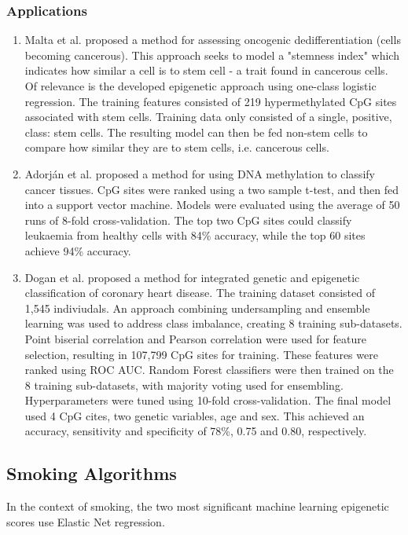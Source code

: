 \documentclass{article}
\begin{document}
\subsubsection{Applications} \label{sec:ml-examples}
\begin{enumerate}
    \item Malta et al. \cite{malta2018machine} proposed a method for assessing oncogenic dedifferentiation (cells becoming cancerous). This approach seeks to model a "stemness index" which indicates how similar a cell is to stem cell - a trait found in cancerous cells. Of relevance is the developed epigenetic approach using one-class logistic regression. The training features consisted of 219 hypermethylated CpG sites associated with stem cells. Training data only consisted of a single, positive, class: stem cells. The resulting model can then be fed non-stem cells to compare how similar they are to stem cells, i.e. cancerous cells.

    \item Adorj\'an et al. \cite{adorjan2002tumour} proposed a method for using DNA methylation to classify cancer tissues. CpG sites were ranked using a two sample t-test, and then fed into a support vector machine. Models were evaluated using the average of 50 runs of 8-fold cross-validation. The top two CpG sites could classify leukaemia from healthy cells with 84\% accuracy, while the top 60 sites achieve 94\% accuracy.

    \item Dogan et al. \cite{dogan2018integrated} proposed a method for integrated genetic and epigenetic classification of coronary heart disease. The training dataset consisted of 1,545 indiviudals. An approach combining undersampling and ensemble learning \cite{liu2008exploratory} was used to address class imbalance, creating 8 training sub-datasets. Point biserial correlation and Pearson correlation were used for feature selection, resulting in 107,799 CpG sites for training. These features were ranked using ROC AUC. Random Forest classifiers were then trained on the 8 training sub-datasets, with majority voting used for ensembling. Hyperparameters were tuned using 10-fold cross-validation. The final model used 4 CpG cites, two genetic variables, age and sex. This achieved an accuracy, sensitivity and specificity of 78\%, 0.75 and 0.80, respectively.
\end{enumerate}

\subsection{Smoking Algorithms}
In the context of smoking, the two most significant machine learning epigenetic scores use Elastic Net regression.
\end{document}
